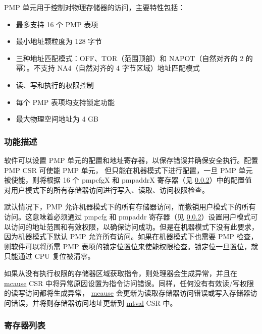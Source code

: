 \documentclass[main\_\_CN.tex]{subfiles}
\begin{document}
PMP 单元用于控制对物理存储器的访问，主要特性包括：

\begin{itemize}
    \item 最多支持 16 个 PMP 表项
    \item 最小地址颗粒度为 128 字节
    \item 三种地址匹配模式：OFF、TOR（范围顶部）和 NAPOT（自然对齐的 2 的幂）。不支持 NA4（自然对齐的 4 字节区域）地址匹配模式
    \item 读、写和执行的权限控制
    \item 每个 PMP 表项均支持锁定功能
    \item 最大物理空间地址为 4 GB
\end{itemize}

\subsubsection{功能描述}
\label{sec:riscvcpu-pmp-func-descr}

软件可以设置 PMP 单元的配置和地址寄存器，以保存错误并确保安全执行。配置 PMP CSR 可使能 PMP 单元， 但只能在机器模式下进行配置，一旦 PMP 单元被使能，则将根据 16 个 pmpcfgX 和 pmpaddrX 寄存器（见 \ref{sec:riscvcpu-pmp-reg-summ}）中的配置值对用户模式下的所有存储器访问进行写入、读取、访问权限检查。

默认情况下，PMP 允许机器模式下的所有存储器访问，而撤销用户模式下的所有访问。这意味着必须通过 pmpcfg 和 pmpaddr 寄存器（见 \ref{sec:riscvcpu-pmp-reg-summ}）设置用户模式可以访问的地址范围和有效权限，以确保访问成功。但是在机器模式下没有此要求，因为机器模式下默认 PMP 允许所有访问。如果在机器模式下也需要 PMP 检查，则软件可以将所需 PMP 表项的锁定位置位来使能权限检查。锁定位一旦置位，就只能通过 CPU 复位被清零。

如果从没有执行权限的存储器区域获取指令，则处理器会生成异常，并且在 \hyperref[regdesc:MCAUSE]{mcause} CSR 中将异常原因设置为指令访问错误。同样，任何没有有效读/写权限的读写访问都将生成异常， \hyperref[regdesc:MCAUSE]{mcause} 会更新为读取存储器访问错误或写入存储器访问错误，并将则存储器访问地址更新到 \hyperref[regdesc:MTVAL]{mtval} CSR 中。


\newpage
\hypertarget{riscvcpu-pmp-reg-summ}{}
\subsubsection{寄存器列表}
\label{sec:riscvcpu-pmp-reg-summ}
\end{document}
